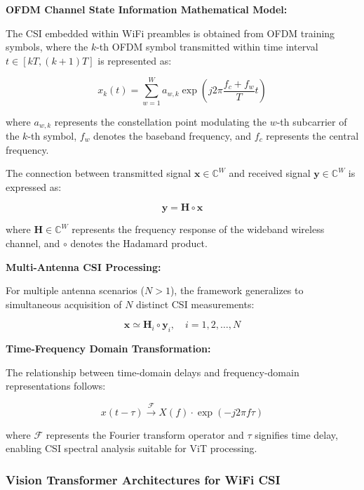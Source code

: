 \documentclass[journal]{IEEEtran}
\begin{document}
\textbf{OFDM Channel State Information Mathematical Model:}

The CSI embedded within WiFi preambles is obtained from OFDM training symbols, where the $k$-th OFDM symbol transmitted within time interval $t \in [kT, (k+1)T]$ is represented as:

\begin{equation}
x_k(t) = \sum_{w=1}^{W} a_{w,k} \exp\left(j2\pi\frac{f_c + f_w}{T}t
\right)
\label{eq:vit_ofdm_symbol}
\end{equation}

where $a_{w,k}$ represents the constellation point modulating the $w$-th subcarrier of the $k$-th symbol, $f_w$ denotes the baseband frequency, and $f_c$ represents the central frequency.

The connection between transmitted signal $\mathbf{x} \in \mathbb{C}^W$ and received signal $\mathbf{y} \in \mathbb{C}^W$ is expressed as:

\begin{equation}
\mathbf{y} = \mathbf{H} \circ \mathbf{x}
\label{eq:vit_channel_relationship}
\end{equation}

where $\mathbf{H} \in \mathbb{C}^W$ represents the frequency response of the wideband wireless channel, and $\circ$ denotes the Hadamard product.

\textbf{Multi-Antenna CSI Processing:}

For multiple antenna scenarios ($N > 1$), the framework generalizes to simultaneous acquisition of $N$ distinct CSI measurements:

\begin{equation}
\mathbf{x} \simeq \mathbf{H}_i \circ \mathbf{y}_i, \quad i = 1, 2, \ldots, N
\label{eq:vit_multi_antenna}
\end{equation}

\textbf{Time-Frequency Domain Transformation:}

The relationship between time-domain delays and frequency-domain representations follows:

\begin{equation}
x(t - \tau) \xrightarrow{\mathcal{F}} X(f) \cdot \exp(-j2\pi f\tau)
\label{eq:vit_fourier_transform}
\end{equation}

where $\mathcal{F}$ represents the Fourier transform operator and $\tau$ signifies time delay, enabling CSI spectral analysis suitable for ViT processing.

\subsubsection{Vision Transformer Architectures for WiFi CSI}
\end{document}
